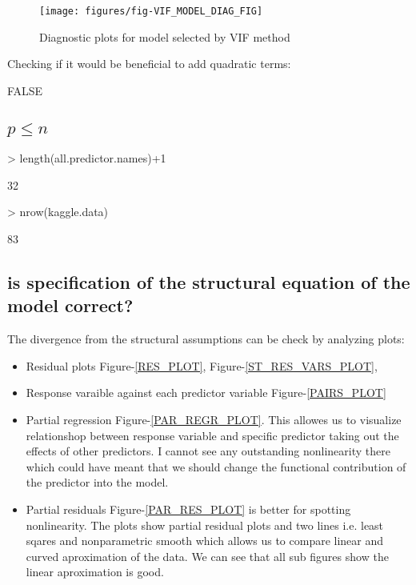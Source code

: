 \documentclass[a4paper]{article}
\begin{document}
\begin{figure}[H]
\begin{center}
\texttt{[image: figures/fig-VIF\_MODEL\_DIAG\_FIG]}
\caption{Diagnostic plots for model selected by VIF method}
\end{center}
\end{figure}

Checking if it would be beneficial to add quadratic terms:
\begin{Schunk}
\begin{Soutput}
[1] FALSE
\end{Soutput}
\end{Schunk}

\subsection{$p \leq n$}
\begin{Schunk}
\begin{Sinput}
> length(all.predictor.names)+1
\end{Sinput}
\begin{Soutput}
[1] 32
\end{Soutput}
\begin{Sinput}
> nrow(kaggle.data)
\end{Sinput}
\begin{Soutput}
[1] 83
\end{Soutput}
\end{Schunk}
\subsection{is specification of the structural equation of the model correct?}
  
The divergence from the structural assumptions can be check by analyzing plots:
\begin{itemize}
  \item Residual plots Figure-\ref{RES_PLOT}, Figure-\ref{ST_RES_VARS_PLOT},
  \item Response varaible against each predictor variable Figure-\ref{PAIRS_PLOT}
  \item Partial regression Figure-\ref{PAR_REGR_PLOT}. This allowes us to
  visualize relationshop between response variable and specific predictor taking
  out the effects of other predictors. I cannot see any outstanding nonlinearity there
  which could have meant that we should change the functional
  contribution of the predictor into the model.
  \item Partial residuals Figure-\ref{PAR_RES_PLOT} is better for spotting
  nonlinearity. The plots show partial residual plots and two lines i.e. least
  sqares and nonparametric smooth which allows us to compare linear and
  curved aproximation of the data. We can see that all sub figures show the
  linear aproximation is good.
\end{itemize}
\end{document}
